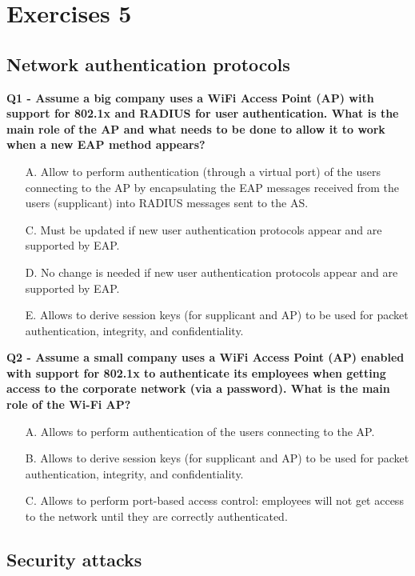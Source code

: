 \chapter*{Exercises 5}

\section*{Network authentication protocols}

\textbf{Q1 - Assume a big company uses a WiFi Access Point (AP) with support for 802.1x and RADIUS for user authentication. 
What is the main role of the AP and what needs to be done to allow it to work when a new EAP method appears?}
\begin{itemize}
    \item[A.] Allow to perform authentication (through a virtual port) of the users connecting to the AP by encapsulating the EAP messages received from the users (supplicant) into RADIUS messages sent to the AS.
    \item[C.] Must be updated if new user authentication protocols appear and are supported by EAP.
    \item[D.] No change is needed if new user authentication protocols appear and are supported by EAP.
    \item[E.] Allows to derive session keys (for supplicant and AP) to be used for packet authentication, integrity, and confidentiality.
\end{itemize}

\textbf{Q2 - Assume a small company uses a WiFi Access Point (AP) enabled with support for 802.1x to authenticate its employees 
when getting access to the corporate network (via a password). What is the main role of the Wi-Fi AP?}
\begin{itemize}
    \item[A.] Allows to perform authentication of the users connecting to the AP.
    \item[B.] Allows to derive session keys (for supplicant and AP) to be used for packet authentication, integrity, and confidentiality.
    \item[C.] Allows to perform port-based access control: employees will not get access to the network until they are correctly authenticated.
\end{itemize}


\section*{Security attacks}

